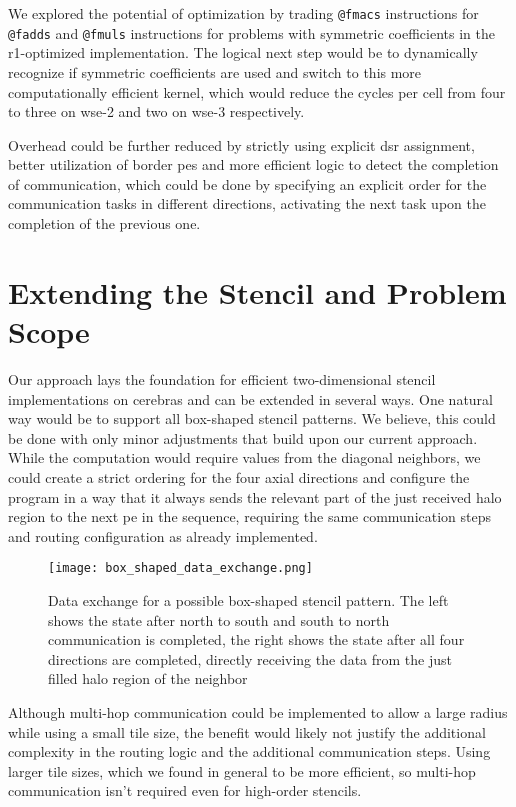 We explored the potential of optimization by trading \texttt{@fmacs} instructions for \texttt{@fadds} and \texttt{@fmuls} instructions for problems with symmetric coefficients in the r1-optimized implementation. The logical next step would be to dynamically recognize if symmetric coefficients are used and switch to  this more computationally efficient kernel, which would reduce the cycles per cell from four to three on \ac{wse}-2 and two on \ac{wse}-3 respectively.

Overhead could be further reduced by strictly using explicit \ac{dsr} assignment, better utilization of border \acp{pe} and more efficient logic to detect the completion of communication, which could be done by specifying an explicit order for the communication tasks in different directions, activating the next task upon the completion of the previous one.

\section{Extending the Stencil and Problem Scope}
Our approach lays the foundation for efficient two-dimensional stencil implementations on cerebras and can be extended in several ways.
One natural way would be to support all box-shaped stencil patterns.
We believe, this could be done with only minor adjustments that build upon our current approach.
While the computation would require values from the diagonal neighbors, we could create a strict ordering for the four axial directions and configure the program in a way that it always sends the relevant part of the just received halo region to the next \ac{pe} in the sequence, requiring the same communication steps and routing configuration as already implemented.

\begin{figure}[h]
    \centering
    \texttt{[image: box\_shaped\_data\_exchange.png]}
    \caption{Data exchange for a possible box-shaped stencil pattern. The left shows the state after north to south and south to north communication is completed, the right shows the state after all four directions are completed, directly receiving the data from the just filled halo region of the neighbor}
    \label{fig:data_exchange_box_shaped}
\end{figure}

Although multi-hop communication could be implemented to allow a large radius while using a small tile size, the benefit would likely not justify the additional complexity in the routing logic and the additional communication steps. Using larger tile sizes, which we found in general to be more efficient, so multi-hop communication isn't required even for high-order stencils.

